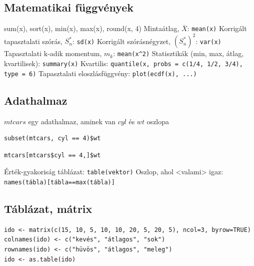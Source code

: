 \documentclass[12pt,a4paper]{article}
\begin{document}
\subsection{Matematikai függvények}

\begin{outline}
	\1 sum(x), sort(x), min(x), max(x), round(x, 4)
	\1 Mintaátlag, $\overline{X}$: \texttt{mean(x)}
	\1 Korrigált tapasztalati szórás, $S^*_n$: \texttt{sd(x)}
	\1 Korrigált szórásnégyzet, $(S^*_n)^2$: \texttt{var(x)}
	\1 Tapasztalati k-adik momentum, $m_k$: \verb|mean(x^2)|
	\1 Statisztikák (min, max, átlag, kvartilisek): \texttt{summary(x)}
	\1 Kvartilis: \texttt{quantile(x, probs = c(1/4, 1/2, 3/4), type = 6)}
	\1 Tapasztalati eloszlásfüggvény: \texttt{plot(ecdf(x), ...)}
\end{outline}

\pagebreak

\subsection{Adathalmaz}

\begin{outline}
	\1 $mtcars$ egy adathalmaz, aminek van $cyl$ és $wt$ oszlopa
	\1 \begin{verbatim}subset(mtcars, cyl == 4)$wt\end{verbatim}
	\1 \begin{verbatim}mtcars[mtcars$cyl == 4,]$wt\end{verbatim}
	\1 Érték-gyakoriság táblázat: \texttt{table(vektor)}
		\2 Oszlop, ahol <valami> igaz: \texttt{names(tábla)[tábla==max(tábla)] }
\end{outline}

\subsection{Táblázat, mátrix}

\begin{verbatim}
ido <- matrix(c(15, 10, 5, 10, 10, 20, 5, 20, 5), ncol=3, byrow=TRUE)
colnames(ido) <- c("kevés", "átlagos", "sok")
rownames(ido) <- c("hüvös", "átlagos", "meleg")
ido <- as.table(ido)\end{verbatim}
\end{document}

